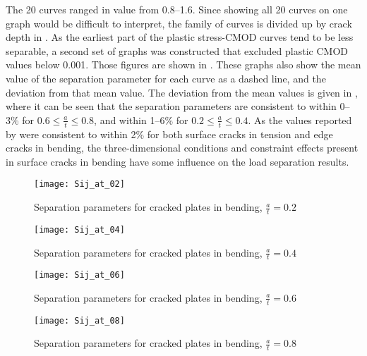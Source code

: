 The 20 \Sij curves ranged in value from 0.8--1.6. Since showing all 20 curves on one graph would be difficult to interpret, the family of curves is divided up by crack depth in .
As the earliest part of the plastic stress-CMOD curves tend to be less separable, a second set of graphs was constructed that excluded plastic CMOD values below 0.001.
Those figures are shown in .
These graphs also show the mean value of the separation parameter \Sij for each curve as a dashed line, and the deviation from that mean value.
The deviation from the mean \Sij values is given in , where it can be seen that the separation parameters are consistent to within 0--3\% for \(0.6 \leq \frac{a}{t} \leq 0.8\), and within 1--6\% for \(0.2 \leq \frac{a}{t} \leq 0.4\).
As the \Sij values reported by \citeauthor{sharobeamlandes1994} were consistent to within 2\% for both surface cracks in tension and edge cracks in bending, the three-dimensional conditions and constraint effects present in surface cracks in bending have some influence on the load separation results.

\begin{figure}[tbp]
\centering
\texttt{[image: Sij\_at\_02]}
\caption{Separation parameters for cracked plates in bending, \(\frac{a}{t}=0.2\) \label{fig:Sij_at_02}}
\end{figure}
\begin{figure}[tbp]
\centering
\texttt{[image: Sij\_at\_04]}
\caption{Separation parameters for cracked plates in bending, \(\frac{a}{t}=0.4\) \label{fig:Sij_at_04}}
\end{figure}
\begin{figure}[tbp]
\centering
\texttt{[image: Sij\_at\_06]}
\caption{Separation parameters for cracked plates in bending, \(\frac{a}{t}=0.6\) \label{fig:Sij_at_06}}
\end{figure}
\begin{figure}[tbp]
\centering
\texttt{[image: Sij\_at\_08]}
\caption{Separation parameters for cracked plates in bending, \(\frac{a}{t}=0.8\) \label{fig:Sij_at_08}}
\end{figure}


